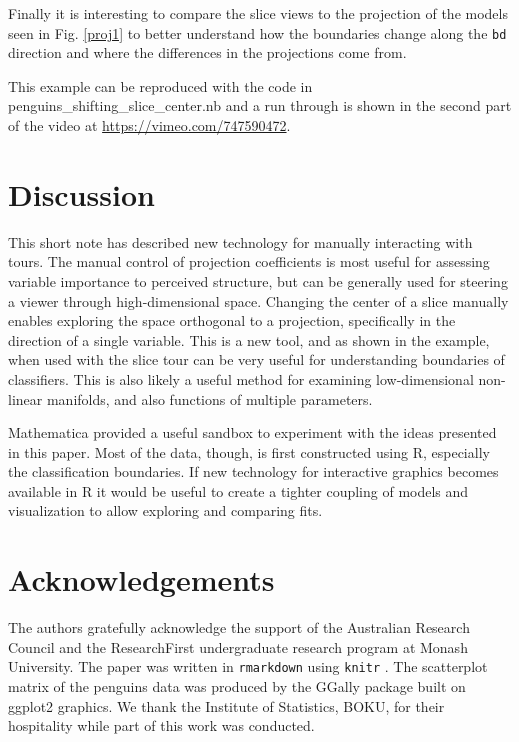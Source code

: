 \documentclass[]{interact}
\theoremstyle{plain}%
\theoremstyle{definition}
\theoremstyle{remark}
\begin{document}
Finally it is interesting to compare the slice views to the projection
of the models seen in Fig. \ref{proj1} to better understand how the
boundaries change along the \texttt{bd} direction and where the
differences in the projections come from.

This example can be reproduced with the code in
penguins\_shifting\_slice\_center.nb and a run through is shown in the
second part of the video at \url{https://vimeo.com/747590472}.

\hypertarget{sec:discussion}{%
\section{Discussion}\label{sec:discussion}}

This short note has described new technology for manually interacting
with tours. The manual control of projection coefficients is most useful
for assessing variable importance to perceived structure, but can be
generally used for steering a viewer through high-dimensional space.
Changing the center of a slice manually enables exploring the space
orthogonal to a projection, specifically in the direction of a single
variable. This is a new tool, and as shown in the example, when used
with the slice tour can be very useful for understanding boundaries of
classifiers. This is also likely a useful method for examining
low-dimensional non-linear manifolds, and also functions of multiple
parameters.

Mathematica provided a useful sandbox to experiment with the ideas
presented in this paper. Most of the data, though, is first constructed
using R, especially the classification boundaries. If new technology for
interactive graphics becomes available in R it would be useful to create
a tighter coupling of models and visualization to allow exploring and
comparing fits.

\hypertarget{acknowledgements}{%
\section*{Acknowledgements}\label{acknowledgements}}

The authors gratefully acknowledge the support of the Australian
Research Council and the ResearchFirst undergraduate research program at
Monash University. The paper was written in \texttt{rmarkdown}
\citep{rmarkdown} using \texttt{knitr} \citep{knitr}. The scatterplot
matrix of the penguins data was produced by the GGally \citep{GGally}
package built on ggplot2 \citep{ggplot2} graphics. We thank the
Institute of Statistics, BOKU, for their hospitality while part of this
work was conducted.
\end{document}
